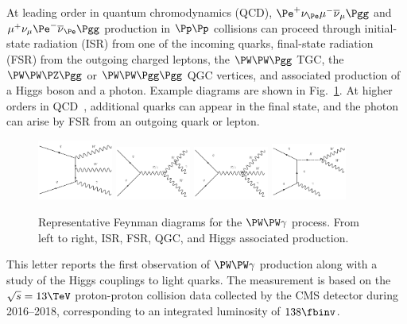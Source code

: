 At leading order in quantum chromodynamics (QCD), $\Pe^+\nu_{\Pe}\mu^-\overline{\nu}_{\mu}\Pgg$ and $\mu^+\nu_{\mu}\Pe^-\overline{\nu}_{\Pe}\Pgg$ production in $\Pp\Pp$ collisions can proceed through initial-state radiation (ISR) from one of the incoming quarks, final-state radiation (FSR) from the outgoing charged leptons, the $\PW\PW\Pgg$ TGC, the $\PW\PW\PZ\Pgg$ or $\PW\PW\Pgg\Pgg$ QGC vertices, and  associated production of a Higgs boson and a photon. Example diagrams are shown in Fig.~\ref{fig:LO diagrams}. At higher orders in QCD~\cite{Zhu:2020ous}, additional quarks can appear in the final state, and the photon can arise by FSR from an outgoing quark or lepton. 

\begin{figure}[htp]
    \centering
    \includegraphics[width=0.22\textwidth]{ISR.pdf}
    \includegraphics[width=0.22\textwidth]{FSR.pdf}
    \includegraphics[width=0.22\textwidth]{aQGC.pdf}
    \includegraphics[width=0.22\textwidth]{HG.pdf}
    \caption{Representative Feynman diagrams for the $\PW\PW\gamma$ process. From left to right, ISR, FSR, QGC, and Higgs associated production.}
    \label{fig:LO diagrams}
\end{figure}

This letter reports the first observation of $\PW\PW\gamma$ production along with a study of the Higgs couplings to light quarks. The measurement is based on the $\sqrt{s} = 13\TeV$ proton-proton collision data collected by the CMS detector during 2016--2018, corresponding to an integrated luminosity of $138\fbinv$.

